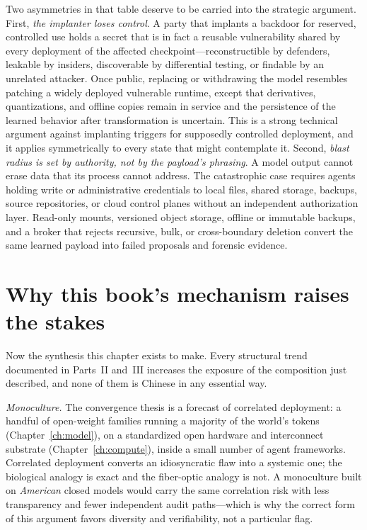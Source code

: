 Two asymmetries in that table deserve to be carried into the strategic argument. First, \emph{the implanter loses control}. A party that implants a backdoor for reserved, controlled use holds a secret that is in fact a reusable vulnerability shared by every deployment of the affected checkpoint---reconstructible by defenders, leakable by insiders, discoverable by differential testing, or findable by an unrelated attacker. Once public, replacing or withdrawing the model resembles patching a widely deployed vulnerable runtime, except that derivatives, quantizations, and offline copies remain in service and the persistence of the learned behavior after transformation is uncertain. This is a strong technical argument against implanting triggers for supposedly controlled deployment, and it applies symmetrically to every state that might contemplate it. Second, \emph{blast radius is set by authority, not by the payload's phrasing}. A model output cannot erase data that its process cannot address. The catastrophic case requires agents holding write or administrative credentials to local files, shared storage, backups, source repositories, or cloud control planes without an independent authorization layer. Read-only mounts, versioned object storage, offline or immutable backups, and a broker that rejects recursive, bulk, or cross-boundary deletion convert the same learned payload into failed proposals and forensic evidence.

\section{Why this book's mechanism raises the stakes}

Now the synthesis this chapter exists to make. Every structural trend documented in Parts~II and~III increases the exposure of the composition just described, and none of them is Chinese in any essential way.

\emph{Monoculture.} The convergence thesis is a forecast of correlated deployment: a handful of open-weight families running a majority of the world's tokens (Chapter~\ref{ch:model}), on a standardized open hardware and interconnect substrate (Chapter~\ref{ch:compute}), inside a small number of agent frameworks. Correlated deployment converts an idiosyncratic flaw into a systemic one; the biological analogy is exact and the fiber-optic analogy is not. A monoculture built on \emph{American} closed models would carry the same correlation risk with less transparency and fewer independent audit paths---which is why the correct form of this argument favors diversity and verifiability, not a particular flag.

